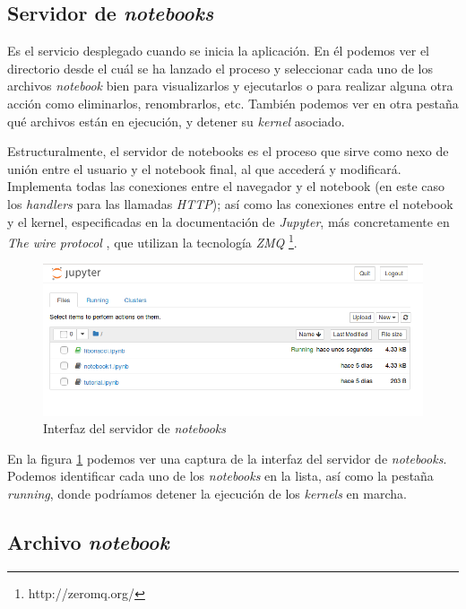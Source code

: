 \documentclass[11pt,spanish,listoffigures,listoftables]{tfgetsinf}
\begin{document}
\subsection{Servidor de \textit{notebooks}}
\label{subsec:estructura-servidor}

Es el servicio desplegado cuando se inicia la aplicación. En él podemos ver el directorio desde el cuál se ha lanzado el proceso y seleccionar cada uno de los archivos \textit{notebook} bien para visualizarlos y ejecutarlos o para realizar alguna otra acción como eliminarlos, renombrarlos, etc.
 También podemos ver en otra pestaña qué archivos están en ejecución, y detener su \textit{kernel} asociado.
 
Estructuralmente, el servidor de notebooks es el proceso que sirve como nexo de unión entre el usuario y el notebook final, al que accederá y modificará. Implementa todas las conexiones entre el navegador y el notebook (en este caso los \textit{handlers} para las llamadas \textit{HTTP}); así como las conexiones entre el notebook y el kernel, especificadas en la documentación de \textit{Jupyter}, más concretamente en \textit{The wire protocol} \cite{wire-protocol}, que utilizan la tecnología \textit{ZMQ} \footnote{http://zeromq.org/}.

\begin{figure}[h]
	\centering
  	\includegraphics[width=\linewidth]{tree.png}
  	\caption{Interfaz del servidor de \textit{notebooks}}
  	\label{fig:tree}
\end{figure}

En la figura \ref{fig:tree} podemos ver una captura de la interfaz del servidor de \textit{notebooks}. Podemos identificar cada uno de los \textit{notebooks} en la lista, así como la pestaña \textit{running}, donde podríamos detener la ejecución de los \textit{kernels} en marcha.


\subsection{Archivo \textit{notebook}}
\label{subsec:estructura-notebook}
\end{document}
